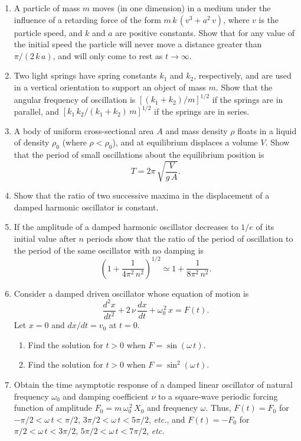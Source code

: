 {\begin{enumerate}
 \item A particle of mass $m$ moves (in one dimension) in a medium under the influence of a
 retarding force of the form $m\,k\,(v^3+a^2\,v)$, where $v$ is the
 particle speed, and $k$ and $a$ are positive constants. Show that
 for any value of the initial speed the particle will
 never move a distance greater than $\pi/(2\,k\,a)$, and will only come to rest as $t\rightarrow \infty$.

\item Two light springs have spring constants $k_1$ and $k_2$, respectively, and are used in a vertical
orientation to support an object of mass $m$. Show that the angular frequency of oscillation
is $[(k_1+k_2)/m]^{1/2}$ if the springs are in parallel, and $[k_1\,k_2/(k_1+k_2)\,m]^{1/2}$
if the springs are in series.

\item A body of uniform cross-sectional area $A$ and mass density $\rho$ floats in a liquid
of density $\rho_0$ (where $\rho<\rho_0$), and at equilibrium displaces a volume $V$. Show
that the period of small oscillations about the equilibrium position is
$$
T = 2\pi\,\sqrt{\frac{V}{g\,A}}.
$$

\item Show that the ratio of two successive maxima in the displacement of a damped
harmonic oscillator is constant.

\item If the amplitude of a damped harmonic oscillator decreases to $1/e$ of its initial
value after $n$ periods show that the ratio of the period of oscillation to the period
of the same oscillator with no damping is
$$
\left(1+\frac{1}{4\pi^2\,n^2}\right)^{1/2}\simeq 1 + \frac{1}{8\pi^2\,n^2}.
$$

\item Consider a damped driven oscillator whose equation of motion is
$$
\frac{d^2 x}{dt^2} + 2\,\nu\,\frac{dx}{dt} + \omega_0^{\,2} \,x = F(t).
$$
Let $x=0$ and $dx/dt = v_0$ at $t=0$.
 \begin{enumerate}
\item Find the solution for $t>0$ when $F = \sin(\omega\,t)$.
\item Find the solution for $t>0$ when $F= \sin^2(\omega\,t)$.
\end{enumerate}

\item Obtain the time asymptotic response of a damped  linear oscillator of natural frequency $\omega_0$ and damping coefficient
$\nu$ to a
square-wave periodic forcing function of amplitude $F_0=m\,\omega_0^{\,2}\,X_0$  and frequency $\omega$. Thus, $F(t) = F_0$ for
$-\pi/2< \omega\,t< \pi/2$, $3\pi/2<\omega\,t<5\pi/2$, {\em etc.}, and
$F(t)=-F_0$ for $\pi/2<\omega\,t<3\pi/2$, $5\pi/2<\omega\,t<7\pi/2$, {\em etc.}
\end{enumerate}
}
